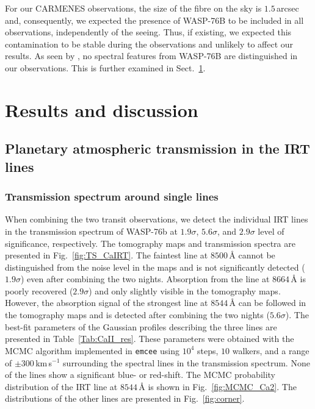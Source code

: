 \documentclass{aa}
\begin{document}
For our CARMENES observations, the size of the fibre on the sky is $1.5$\,arcsec and, consequently, we expected the presence of WASP-76B to be included in all observations, independently of the seeing. Thus, if existing, we expected this contamination to be stable during the observations and unlikely to affect our results. As seen by \citet{Ehrenreich2020}, no spectral features from WASP-76B are distinguished in our observations. This is further examined in Sect.~\ref{sec:results}.


\section{Results and discussion} \label{sec:results}



\subsection{Planetary atmospheric transmission in the  IRT lines}  \label{sec:results_Ca}

\subsubsection{Transmission spectrum around single lines}

When combining the two transit observations, we detect the individual  IRT lines in the transmission spectrum of WASP-76b at $1.9\sigma$, $5.6\sigma$, and $2.9\sigma$ level of significance, respectively. The tomography maps and transmission spectra are presented in Fig.~\ref{fig:TS_CaIRT}. 
The faintest line at $8500$\,{\AA} cannot be distinguished from the noise level in the maps and is not significantly detected ($1.9\sigma$) even after combining the two nights. 
Absorption from the line at $8664$\,{\AA} is poorly recovered ($2.9\sigma$) and only slightly visible in the tomography maps. However, the absorption signal of the strongest line at $8544$\,{\AA} can be followed in the tomography maps and is detected after combining the two nights ($5.6\sigma$). 
The best-fit parameters of the Gaussian profiles describing the three lines are presented in Table~\ref{Tab:CaII_res}. These parameters were obtained with the MCMC algorithm implemented in {\tt emcee} \citep{emcee} using $10^4$ steps, $10$ walkers, and a range of $\pm300$\,km\,s$^{-1}$ surrounding the spectral lines in the transmission spectrum. None of the lines show a significant blue- or red-shift. The MCMC probability distribution of the  IRT line at $8544$\,{\AA} is shown in Fig.~\ref{fig:MCMC_Ca2}. The distributions of the other lines are presented in Fig.~\ref{fig:corner}.
\end{document}
